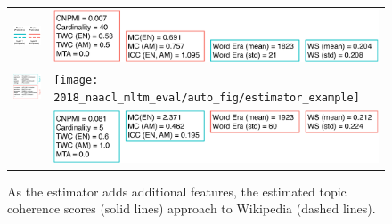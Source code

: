 \begin{figure}[t!]
  \newcommand{\estimatorl}{.3}
  \newcommand{\estimatorr}{.65}
\begin{tabular}{cl}
\includegraphics[width=.2\linewidth]{2018_naacl_mltm_eval/figures/estimator_legend}&\includegraphics[width=\estimatorr\linewidth]{2018_naacl_mltm_eval/figures/estimator_top_features}\\
\includegraphics[width=\estimatorl\linewidth]{2018_naacl_mltm_eval/figures/estimator_topics}&\texttt{[image: 2018\_naacl\_mltm\_eval/auto\_fig/estimator\_example]}\\
& \includegraphics[width=\estimatorr\linewidth]{2018_naacl_mltm_eval/figures/estimator_bottom_features}
\end{tabular}
	\caption{As the estimator adds additional features, the
          estimated topic coherence scores (solid lines) approach to
          Wikipedia \cnpmi{} (dashed lines).}
	\label{fig:example2}
\end{figure}



